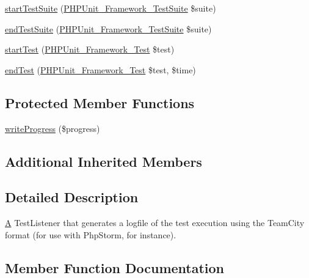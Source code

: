 \begin{DoxyCompactItemize}
\item 
\mbox{\hyperlink{class_p_h_p_unit___util___log___team_city_a901a86a623d83184267b21f2daee0ff5}{start\+Test\+Suite}} (\mbox{\hyperlink{class_p_h_p_unit___framework___test_suite}{P\+H\+P\+Unit\+\_\+\+Framework\+\_\+\+Test\+Suite}} \$suite)
\item 
\mbox{\hyperlink{class_p_h_p_unit___util___log___team_city_aeec28a4d1328434916ebcdc1ca6b5527}{end\+Test\+Suite}} (\mbox{\hyperlink{class_p_h_p_unit___framework___test_suite}{P\+H\+P\+Unit\+\_\+\+Framework\+\_\+\+Test\+Suite}} \$suite)
\item 
\mbox{\hyperlink{class_p_h_p_unit___util___log___team_city_a1a9bddc54f26bb3fb5c2ec9778ea5198}{start\+Test}} (\mbox{\hyperlink{interface_p_h_p_unit___framework___test}{P\+H\+P\+Unit\+\_\+\+Framework\+\_\+\+Test}} \$test)
\item 
\mbox{\hyperlink{class_p_h_p_unit___util___log___team_city_a6de65eea8b294795cbc34c4c8cee8546}{end\+Test}} (\mbox{\hyperlink{interface_p_h_p_unit___framework___test}{P\+H\+P\+Unit\+\_\+\+Framework\+\_\+\+Test}} \$test, \$time)
\end{DoxyCompactItemize}
\subsection*{Protected Member Functions}
\begin{DoxyCompactItemize}
\item 
\mbox{\hyperlink{class_p_h_p_unit___util___log___team_city_ae4b5d735668488399d06c4af87fe32fb}{write\+Progress}} (\$progress)
\end{DoxyCompactItemize}
\subsection*{Additional Inherited Members}


\subsection{Detailed Description}
\mbox{\hyperlink{class_a}{A}} Test\+Listener that generates a logfile of the test execution using the Team\+City format (for use with Php\+Storm, for instance). 

\subsection{Member Function Documentation}
\mbox{\label{class_p_h_p_unit___util___log___team_city_a320d7bc7d2f9264ee7ba7aca6fd2df41}} 
